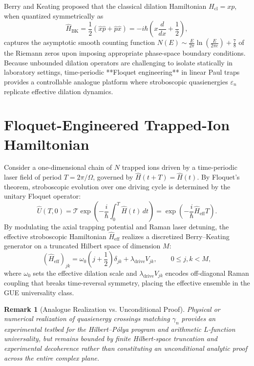 \documentclass[11pt,a4paper]{article}
\newtheorem{remark}[theorem]{Remark}
\begin{document}
Berry and Keating proposed that the classical dilation Hamiltonian $H_{\mathrm{cl}} = xp$, when quantized symmetrically as
\begin{equation}
\hat{H}_{\mathrm{BK}} = \frac{1}{2}(\hat{x}\hat{p} + \hat{p}\hat{x}) = -i\hbar \left(x \frac{d}{dx} + \frac{1}{2}\right),
\end{equation}
captures the asymptotic smooth counting function $N(E) \sim \frac{E}{2\pi} \ln\left(\frac{E}{2\pi e}\right) + \frac{7}{8}$ of the Riemann zeros upon imposing appropriate phase-space boundary conditions. Because unbounded dilation operators are challenging to isolate statically in laboratory settings, time-periodic **Floquet engineering** in linear Paul traps provides a controllable analogue platform where stroboscopic quasienergies $\varepsilon_n$ replicate effective dilation dynamics.

\section{Floquet-Engineered Trapped-Ion Hamiltonian}
Consider a one-dimensional chain of $N$ trapped ions driven by a time-periodic laser field of period $T = 2\pi/\Omega$, governed by $\hat{H}(t + T) = \hat{H}(t)$. By Floquet's theorem, stroboscopic evolution over one driving cycle is determined by the unitary Floquet operator:
\begin{equation}
\hat{U}(T, 0) = \mathcal{T} \exp\left( -\frac{i}{\hbar} \int_0^T \hat{H}(t)\, dt \right) = \exp\left( -\frac{i}{\hbar} \hat{H}_{\mathrm{eff}} T \right).
\end{equation}
By modulating the axial trapping potential and Raman laser detuning, the effective stroboscopic Hamiltonian $\hat{H}_{\mathrm{eff}}$ realizes a discretized Berry--Keating generator on a truncated Hilbert space of dimension $M$:
\begin{equation}
(\hat{H}_{\mathrm{eff}})_{jk} = \omega_0 \left(j + \frac{1}{2}\right)\delta_{jk} + \lambda_{\mathrm{drive}} V_{jk}, \qquad 0 \le j, k < M,
\end{equation}
where $\omega_0$ sets the effective dilation scale and $\lambda_{\mathrm{drive}} V_{jk}$ encodes off-diagonal Raman coupling that breaks time-reversal symmetry, placing the effective ensemble in the GUE universality class.

\begin{remark}[Analogue Realization vs. Unconditional Proof]
Physical or numerical realization of quasienergy crossings matching $\gamma_n$ provides an experimental testbed for the Hilbert--P\'olya program and arithmetic $L$-function universality, but remains bounded by finite Hilbert-space truncation and experimental decoherence rather than constituting an unconditional analytic proof across the entire complex plane.
\end{remark}
\end{document}
